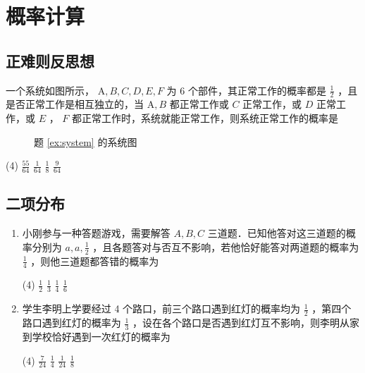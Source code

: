 \section{概率计算}

\subsection{正难则反思想}

\begin{example} \label{ex:system}
    一个系统如图所示， $\mathrm{A}, B, C, D, E, F$ 为 6 个部件，其正常工作的概率都是 $\frac{1}{2}$ ，且是否正常工作是相互独立的，当 $\mathrm{A}, B$ 都正常工作或 $C$ 正常工作，或 $D$ 正常工作，或 $E$ ， $F$ 都正常工作时，系统就能正常工作，则系统正常工作的概率是

    \begin{figure} [H]
        \centering
        \resizebox{0.25\textwidth}{!}{}
        \caption{题 \ref{ex:system} 的系统图}
        \label{fig:system}
    \end{figure}

    \begin{tasks}(4)
        \task $\frac{55}{64}$
        \task $\frac{1}{64}$
        \task $\frac{1}{8}$
        \task $\frac{9}{64}$
    \end{tasks}



\end{example}

\subsection{二项分布}

\begin{enumerate}

    \item 小刚参与一种答题游戏，需要解答 $A, B, C$ 三道题．已知他答对这三道题的概率分别为 $a, a, \frac{1}{2}$ ，且各题答对与否互不影响，若他恰好能答对两道题的概率为 $\frac{1}{4}$ ，则他三道题都答错的概率为
          \begin{tasks}(4)
              \task $\frac{1}{2}$
              \task $\frac{1}{3}$
              \task $\frac{1}{4}$
              \task $\frac{1}{6}$
          \end{tasks}

    \item 学生李明上学要经过 4 个路口，前三个路口遇到红灯的概率均为 $\frac{1}{2}$ ，第四个路口遇到红灯的概率为 $\frac{1}{3}$ ，设在各个路口是否遇到红灯互不影响，则李明从家到学校恰好遇到一次红灯的概率为
          \begin{tasks}(4)
              \task $\frac{7}{24}$
              \task $\frac{1}{4}$
              \task $\frac{1}{24}$
              \task $\frac{1}{8}$
          \end{tasks}
\end{enumerate}

